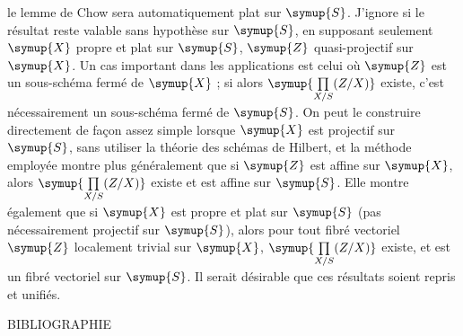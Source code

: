 le lemme de Chow sera automatiquement plat sur $\symup{S}$.
J'ignore si le résultat reste valable sans hypothèse sur $\symup{S}$, en supposant
seulement $\symup{X}$ propre et plat sur $\symup{S}$, $\symup{Z}$ quasi-projectif sur $\symup{X}$. Un cas
important dans les applications est celui où $\symup{Z}$ est un sous-schéma fermé de
$\symup{X}$ ; si alors $\symup{\prod\limits_{X/S}(Z/X)}$ existe, c'est nécessairement un sous-schéma
fermé de $\symup{S}$. On peut le
construire directement de façon assez simple lorsque $\symup{X}$ est projectif sur $\symup{S}$,
sans utiliser la théorie des schémas de Hilbert, et la méthode employée montre
plus généralement que si $\symup{Z}$ est affine sur $\symup{X}$, alors $\symup{\prod\limits_{X/S}(Z/X)}$ existe
et est affine sur $\symup{S}$. Elle montre également que si $\symup{X}$ est propre et plat sur
$\symup{S}$ (pas nécessairement projectif sur $\symup{S}$), alors pour tout fibré vectoriel $\symup{Z}$
localement trivial sur $\symup{X}$, $\symup{\prod\limits_{X/S}(Z/X)}$ existe, et est un fibré vectoriel
sur $\symup{S}$. Il serait désirable que ces résultats soient repris et unifiés.

\begin{center}BIBLIOGRAPHIE\end{center}

